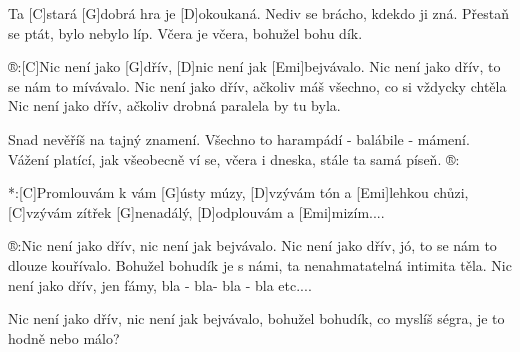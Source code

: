 
Ta [C]stará [G]dobrá hra je [D]okoukaná.
Nediv se brácho, kdekdo ji zná.
Přestaň se ptát, bylo nebylo líp.
Včera je včera, bohužel bohu dík.

®:[C]Nic není jako [G]dřív, [D]nic není jak [Emi]bejvávalo.
Nic není jako dřív, to se nám to mívávalo.
Nic není jako dřív, ačkoliv máš všechno,
co si vždycky chtěla
Nic není jako dřív, ačkoliv drobná paralela by tu byla.

Snad nevěříš na tajný znamení.
Všechno to harampádí - balábile - mámení.
Vážení platící, jak všeobecně ví se,
včera i dneska, stále ta samá píseň.
®:

*:[C]Promlouvám k vám [G]ústy múzy,
[D]vzývám tón a [Emi]lehkou chůzi,
[C]vzývám zítřek [G]nenadálý,
[D]odplouvám a [Emi]mizím....

®:Nic není jako dřív, nic není jak bejvávalo.
Nic není jako dřív, jó, to se nám to dlouze kouřívalo.
Bohužel bohudík je s námi, ta nenahmatatelná intimita těla.
Nic není jako dřív, jen fámy,
bla - bla- bla - bla etc....

Nic není jako dřív, nic není jak bejvávalo,
bohužel bohudík, co myslíš ségra, je to hodně nebo málo?

